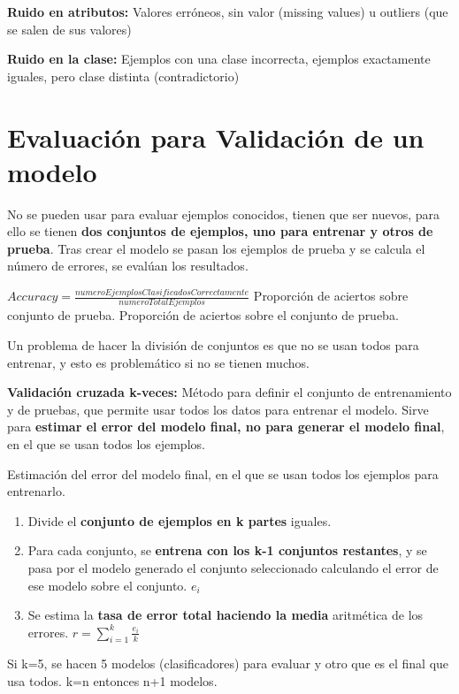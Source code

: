 \documentclass[12pt, twoside, openright]{report} %
\begin{document}
\textbf{Ruido en atributos:} Valores erróneos, sin valor (missing values) u outliers (que se salen de sus valores)

\textbf{Ruido en la clase:} Ejemplos con una clase incorrecta, ejemplos
exactamente iguales, pero clase distinta (contradictorio)

\section{Evaluación para Validación de un
  modelo}

No se pueden usar para evaluar ejemplos conocidos, tienen que ser
nuevos, para ello se tienen \textbf{dos conjuntos de ejemplos, uno para
	entrenar y otros de prueba}. Tras crear el modelo se pasan los ejemplos
de prueba y se calcula el número de errores, se evalúan los resultados.

$Accuracy= \frac {numeroEjemplosClasificadosCorrectamente}{numeroTotalEjemplos}$
Proporción de aciertos sobre conjunto de prueba.
Proporción de aciertos sobre el conjunto de prueba.

Un problema de hacer la división de conjuntos es que no se usan todos
para entrenar, y esto es problemático si no se tienen muchos.

\textbf{Validación cruzada k-veces:} Método para definir el conjunto de
entrenamiento y de pruebas, que permite usar todos los datos para
entrenar el modelo. Sirve para \textbf{estimar el error del modelo
	final, no para generar el modelo final}, en el que se usan todos los
ejemplos.

Estimación del error del modelo final, en el que se usan todos los
ejemplos para entrenarlo.

\begin{enumerate}
	\def\labelenumi{\arabic{enumi}.}
	\item Divide el \textbf{conjunto de ejemplos en k partes} iguales.
	\item Para cada conjunto, se \textbf{entrena con los k-1 conjuntos
		      restantes}, y se pasa por el modelo generado el conjunto seleccionado
	      calculando el error de ese modelo sobre el conjunto. \(e_i\)
	\item Se estima la \textbf{tasa de error total haciendo la media} aritmética
	      de los errores. \(r= \sum_{i=1}^k \frac {e_i}{k}\)
\end{enumerate}

Si k=5, se hacen 5 modelos (clasificadores) para evaluar y otro que es
el final que usa todos. k=n entonces n+1 modelos.
\end{document}
